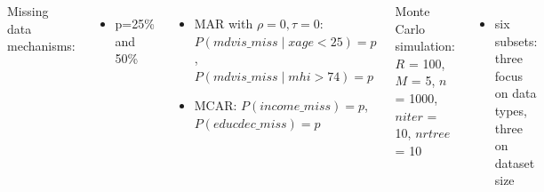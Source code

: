 \documentclass[20pt,margin=1in,innermargin=-4.5in,blockverticalspace=-0.25in]{tikzposter}
\begin{document}
\begin{columns}
{        Missing data mechanisms:
        \vspace{-0.5em}
        \begin{itemize}
            \item p=25\% and 50\%
        \end{itemize}
        \vspace{-1.5em}
        \begin{itemize}
            \item MAR with $\rho=0,\tau=0$: $P(mdvis\_miss \mid xage<25) = p$, \\
            $P(mdvis\_miss \mid mhi>74) = p$ 
            \vspace{-0.5em}
            \item MCAR: $P(income\_miss) = p$, $P(educdec\_miss) = p$
        \end{itemize}
        
        \vspace{-0.5em}
        
        Monte Carlo simulation: $R$ = 100, $M$ = 5, $n$ = 1000, $niter$ = 10, $nrtree$ = 10
        \vspace{-0.5em}
        \begin{itemize}
            \item six subsets: three focus on data types, three on dataset size
        \end{itemize}
        \vspace{-1em}
    }


\end{columns}
\end{document}
